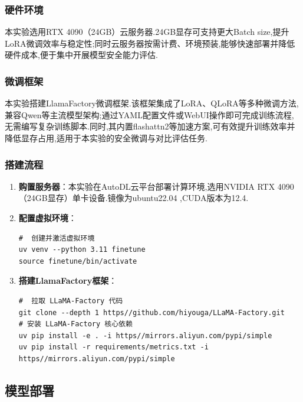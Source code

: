 \documentclass[12pt]{ctexart}
\begin{document}
\subsubsection{硬件环境}
本实验选用RTX 4090（24GB）云服务器.24GB显存可支持更大Batch size,提升LoRA微调效率与稳定性;同时云服务器按需计费、环境预装,能够快速部署并降低硬件成本,便于集中开展模型安全能力评估.

\subsubsection{微调框架}
本实验搭建LlamaFactory微调框架.该框架集成了LoRA、QLoRA等多种微调方法,兼容Qwen等主流模型架构;通过YAML配置文件或WebUI操作即可完成训练流程,无需编写复杂训练脚本.同时,其内置flashattn2等加速方案,可有效提升训练效率并降低显存占用,适用于本实验的安全微调与对比评估任务.

\subsubsection{搭建流程}

\begin{enumerate}

    \item \textbf{购置服务器}：本实验在AutoDL云平台部署计算环境,选用NVIDIA RTX 4090（24GB显存）单卡设备.镜像为ubuntu22.04 ,CUDA版本为12.4.

    \item \textbf{配置虚拟环境}：

          \begin{lstlisting}
#  创建并激活虚拟环境
uv venv --python 3.11 finetune
source finetune/bin/activate
          \end{lstlisting}

    \item \textbf{搭建LlamaFactory框架}：

          \begin{lstlisting}
#  拉取 LLaMA-Factory 代码
git clone --depth 1 https//github.com/hiyouga/LLaMA-Factory.git
# 安装 LLaMA-Factory 核心依赖
uv pip install -e . -i https//mirrors.aliyun.com/pypi/simple
uv pip install -r requirements/metrics.txt -i https//mirrors.aliyun.com/pypi/simple
          \end{lstlisting}

\end{enumerate}

\subsection{模型部署}
\end{document}
